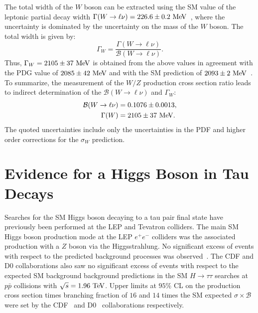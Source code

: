 The total width of the $W$ boson can be extracted using the SM value of the leptonic partial decay width $\Gamma(W \rightarrow \ell \nu)=226.6 \pm 0.2~\mathrm{Me\kern -0.1em V}$~\cite{Rosner:1993rj,Renton:2008ub}, where the uncertainty is dominated by the uncertainty on the mass of the $W$ boson. The total width is given by:
\begin{equation} \label{eq:xsec4}
\Gamma_W = \frac{\Gamma(W \rightarrow \ell \nu)}{\mathcal{B}(W \rightarrow \ell \nu) }.
\end{equation}
Thus, $\Gamma_W = 2105 \pm 37~\mathrm{Me\kern -0.1em V}$ is obtained from the above values in agreement with the PDG value of $2085 \pm 42~\mathrm{Me\kern -0.1em V}$ and with the SM prediction of $2093 \pm 2~\mathrm{Me\kern -0.1em V}$~\cite{Renton:2008ub}. To summarize, the measurement of the $W/Z$ production cross section ratio leads to indirect determination of the $\mathcal{B}(W\rightarrow \ell\nu)$  and $\Gamma_W$:
\begin{eqnarray} \label{eq:xsecm}
\begin{aligned}
\mathcal{B}(W\rightarrow \ell\nu) &= 0.1076 \pm 0.0013, \\
\Gamma(W) &= 2105 \pm 37~\mathrm{Me\kern -0.1em V}.
\end{aligned}
\end{eqnarray}
The quoted uncertainties include only the uncertainties in the PDF and higher order corrections for the $\sigma_W$ prediction. 
 
\newpage 

\section{Evidence for a Higgs Boson in Tau Decays}

Searches for the SM Higgs boson decaying to a tau pair final state have previously been performed at the LEP and Tevatron colliders. The main SM Higgs boson production mode at the LEP $e^{+}e^{-}$ colliders was the associated production with a $Z$ boson via the Higgsstrahlung. No significant excess of events with respect to the predicted background processes was observed~\cite{Barate:2000ts,Abbiendi:2000ac,Achard:2001pj,Abdallah:2003ip}. The CDF and D$0$ collaborations also saw no significant excess of events with respect to the expected SM background background predictions in the SM $H \rightarrow \tau\tau$ searches at $p\bar{p}$ collisions with $\sqrt{s}=1.96~\mathrm{Te\kern -0.1em V}$. Upper limits at $95\%$ CL on the production cross section times branching fraction of $16$ and $14$ times the SM expected $\sigma \times \mathcal{B}$ were set by the CDF~\cite{Aaltonen:2012jh} and D$0$~\cite{Abazov:2012zj} collaborations respectively. 

